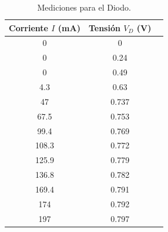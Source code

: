 \begin{table}[htpb]
    \centering
    \begin{tabular}{ccc}
        \toprule
        Corriente $I$ (mA) & Tensión $V_D$ (V) \\
        \midrule
        0 &	0 \\
        0	& 0.24 \\
        0	& 0.49 \\
        4.3	& 0.63 \\
        47	& 0.737 \\
        67.5	& 0.753 \\
        99.4	& 0.769 \\
        108.3	& 0.772 \\
        125.9	& 0.779 \\
        136.8	& 0.782 \\
        169.4	& 0.791 \\
        174	& 0.792 \\
        197	& 0.797 \\
        \bottomrule
    \end{tabular}
    \caption{Mediciones para el Diodo.}
    \label{tab:diodo}
\end{table}